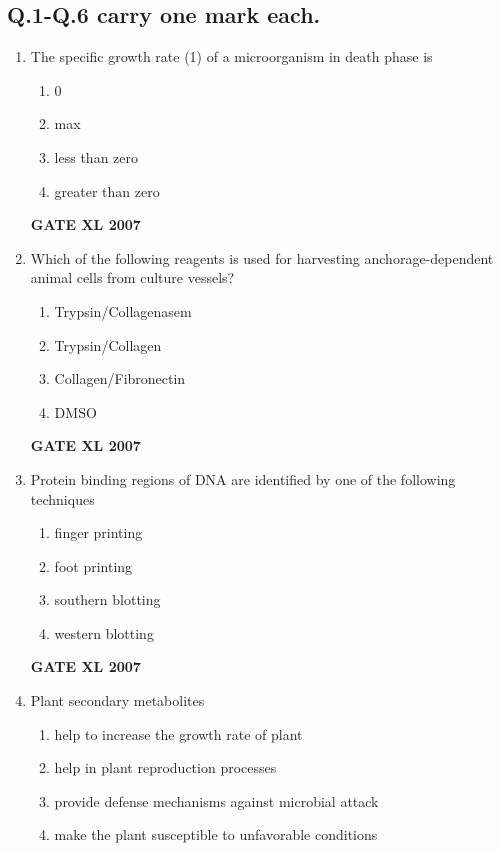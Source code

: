 \documentclass[journal,12pt,onecolumn]{IEEEtran}
\begin{document}
\subsection*{Q.1-Q.6 carry one mark each.}
\begin{enumerate}
    \item The specific growth rate (1) of a microorganism in death phase is
	    \begin{multicols}{2}
        \begin{enumerate} 
            \item 0
            \item max
            \item less than zero
            \item greater than zero
        \end{enumerate}
    \end{multicols}

	    \hfill \textbf{GATE XL 2007}
    \item Which of the following reagents is used for harvesting anchorage-dependent animal cells from culture vessels?
    \begin{multicols}{2}
        \begin{enumerate} 
            \item Trypsin/Collagenasem
            \item Trypsin/Collagen
            \item Collagen/Fibronectin
            \item DMSO
        \end{enumerate}
    \end{multicols}

	    \hfill \textbf{GATE XL 2007}
    \item Protein binding regions of DNA are identified by one of the following techniques

    \begin{multicols}{2}
        \begin{enumerate} 
            \item finger printing 
            \item foot printing
            \item southern blotting 
            \item western blotting
        \end{enumerate}
    \end{multicols}

	    \hfill \textbf{GATE XL 2007}
    \item Plant secondary metabolites
    \begin{multicols}{2}
        \begin{enumerate} 
            \item help to increase the growth rate of plant
            \item help in plant reproduction processes
            \item provide defense mechanisms against microbial attack
            \item make the plant susceptible to unfavorable conditions		    


\end{enumerate}
\end{multicols}
\end{enumerate}
\end{document}
